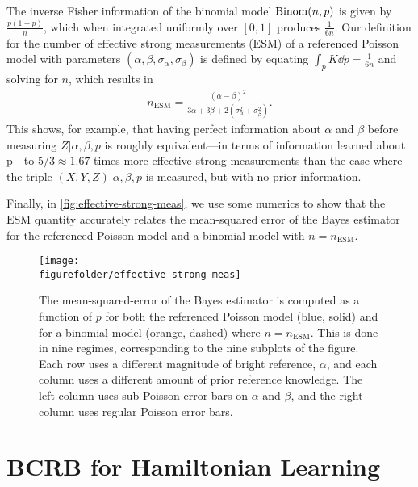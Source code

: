 \documentclass[aps,nofootinbib,prl,twocolumn,superscriptaddress]{revtex4}
\newcommand{\figurefolder}{../fig}
\newcommand{\ESM}{\text{ESM}}
\begin{document}
The inverse Fisher information of the binomial model $\operatorname{Binom}(n,p)$
is given by $\frac{p(1-p)}{n}$, which when integrated uniformly over 
$[0,1]$ produces $\frac{1}{6n}$.
Our definition for the number of effective strong measurements (ESM)
of a referenced Poisson model with parameters 
$(\alpha,\beta,\sigma_\alpha,\sigma_\beta)$ is defined by 
equating $\int_p K\dd p=\frac{1}{6n}$ and solving for $n$,
which results in
\begin{align}
    n_\ESM = \frac{
            (\alpha-\beta)^2
        }{
            3\alpha+3\beta+2\left(\sigma_\alpha^2+\sigma_\beta^2\right)
        }.
\end{align}
This shows, for example, 
that having perfect information about $\alpha$ and $\beta$
before measuring $Z|\alpha,\beta,p$ is roughly equivalent---in terms
of information learned about p---to 
$5/3\approx 1.67$ times more effective strong measurements 
than the case where the triple $(X,Y,Z)|\alpha,\beta,p$ is
measured, but with no prior information.

Finally, in \autoref{fig:effective-strong-meas}, we use some numerics
to show that the $\ESM$
quantity accurately relates the mean-squared error of the Bayes estimator
for the referenced Poisson model and a binomial model with $n=n_\ESM$.

\begin{figure}
    \texttt{[image: \\figurefolder/effective-strong-meas]}
    \caption{The mean-squared-error of the Bayes estimator is computed
    as a function of $p$
    for both the referenced Poisson model (blue, solid) and for a binomial model
    (orange, dashed) where $n=n_\ESM$.
    This is done in nine regimes, corresponding to the nine subplots of the figure.
    Each row uses a different magnitude of bright reference, $\alpha$,
    and each column uses a different amount of prior reference knowledge.
    The left column uses sub-Poisson error bars on $\alpha$ and $\beta$,
    and the right column uses regular Poisson error bars.}
    \label{fig:effective-strong-meas}
\end{figure}

\section{BCRB for Hamiltonian Learning}
\label{apx:bcrb}
\end{document}
